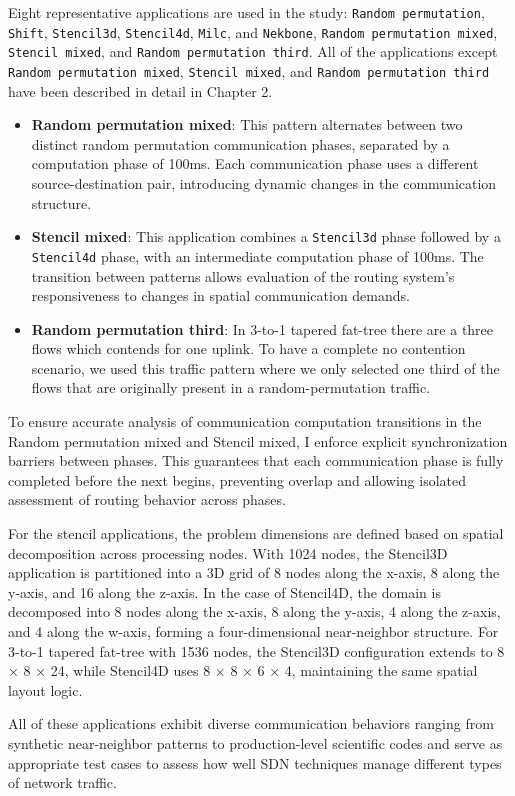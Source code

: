 Eight representative applications are used in the study:
\texttt{Random permutation}, \texttt{Shift}, \texttt{Stencil3d}, \texttt{Stencil4d}, \texttt{Milc}, and \texttt{Nekbone}, \texttt{Random permutation mixed}, \texttt{Stencil mixed}, and \texttt{Random permutation third}. All of the applications except \texttt{Random permutation mixed}, \texttt{Stencil mixed}, and \texttt{Random permutation third} have been described
in detail in Chapter 2.

\begin{itemize}
\item \textbf{Random permutation mixed}: This pattern alternates between two distinct random permutation communication phases, separated by a computation phase of 100ms. Each communication phase uses a different source-destination pair, introducing dynamic changes in the communication structure.

\item \textbf{Stencil mixed}: This application combines a \texttt{Stencil3d} phase followed by a \texttt{Stencil4d} phase, with an intermediate computation phase of 100ms. The transition between patterns allows evaluation of the routing system’s responsiveness to changes in spatial communication demands.

\item \textbf{Random permutation third}: In 3-to-1 tapered fat-tree there are a three flows which contends for one uplink. To have a complete no contention scenario, we used this traffic pattern where we only selected one third of the flows that are originally present in a random-permutation traffic.
\end{itemize}

To ensure accurate analysis of communication computation transitions in the Random permutation mixed and Stencil mixed, I enforce
explicit synchronization barriers between phases. This guarantees
that each communication phase is fully completed before the next begins,
preventing overlap and allowing isolated assessment of routing behavior across phases.

For the stencil applications, the problem dimensions are defined based on spatial decomposition across processing nodes. With 1024 nodes, the Stencil3D application is partitioned into a 3D grid of 8 nodes along the x-axis, 8 along the y-axis, and 16 along the z-axis. In the case of Stencil4D, the domain is decomposed into 8 nodes along the x-axis, 8 along the y-axis, 4 along the z-axis, and 4 along the w-axis, forming a four-dimensional near-neighbor structure. For 3-to-1 tapered fat-tree with 1536 nodes, the Stencil3D configuration extends to 8 × 8 × 24, while Stencil4D uses 8 × 8 × 6 × 4, maintaining the same spatial layout logic.

All of these applications exhibit diverse communication behaviors ranging from synthetic
near-neighbor patterns to production-level scientific codes
and serve as appropriate test cases to assess how well SDN techniques
manage different types of network traffic.
